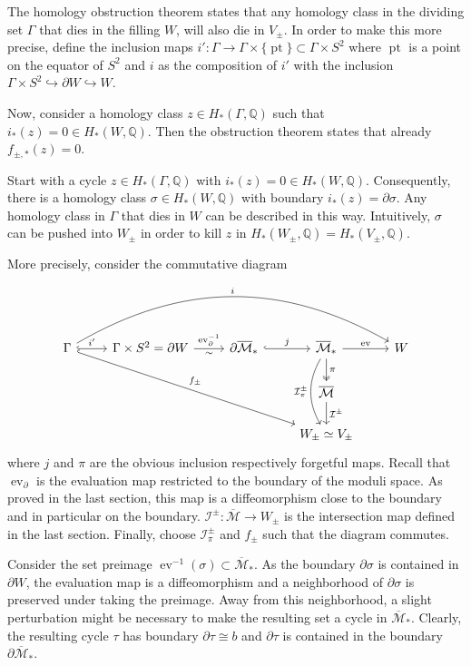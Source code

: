 The homology obstruction theorem states that any homology class in the dividing set $\Gamma$ that dies in the filling $W$,
will also die in $V_\pm$.
In order to make this more precise, define the inclusion maps
$i'\colon \Gamma \to \Gamma \times \{\operatorname{pt}\} \subset \Gamma \times S^2$ where $\operatorname{pt}$ is a point on the equator of $S^2$
and $i$ as the composition of $i'$ with the inclusion $\Gamma \times S^2 \hookrightarrow \partial W \hookrightarrow W$. 

Now, consider a homology class $z \in H_*(\Gamma, \mathbb{Q})$ such that $i_*(z) = 0 \in H_*(W, \mathbb{Q})$.
Then the obstruction theorem states that already $f_{\pm,*}(z) = 0$.


Start with a cycle $z \in H_*(\Gamma, \mathbb Q)$ with $i_*(z) = 0 \in H_*(W, \mathbb{Q})$.
Consequently, there is a homology class $\sigma \in H_*(W, \mathbb Q)$ with boundary $i_*(z) = \partial \sigma$.
Any homology class in $\Gamma$ that dies in $W$ can be described in this way.
Intuitively, $\sigma$ can be pushed into $W_\pm$ in order to kill $z$ in $H_*(W_\pm, \mathbb{Q}) = H_*(V_\pm, \mathbb{Q})$.

More precisely, consider the commutative diagram
\[
\begin{tikzcd}
    \Gamma \arrow[r, hook, "i'"] \arrow[rrrr, bend left, "i"] \arrow[rrrdd, hook, "f_\pm"]
        & \Gamma \times S^2  = \partial W  \arrow[r, "\operatorname{ev}_\partial^{-1}", "\sim" below]
        & \partial \overline{\mathcal M}_* \arrow[r, hook, "j"]
        & \overline{\mathcal M}_*          \arrow[r, "\operatorname{ev}"] \arrow[d, twoheadrightarrow, "\pi"] \arrow[dd, bend right, "\mathcal I_\pi^\pm" left]
        & W \\
    &&& \overline{\mathcal M} \arrow[d, "\mathcal{I}^\pm"]  &   \\
    &&& W_\pm \simeq V_\pm                                  &   
\end{tikzcd}
\]
where $j$ and $\pi$ are the obvious inclusion respectively forgetful maps.
Recall that $\operatorname{ev}_\partial$ is the evaluation map restricted to the boundary of the moduli space. 
As proved in the last section, this map is a diffeomorphism close to the boundary and in particular on the boundary.
$\mathcal{I}^\pm\colon \overline{\mathcal{M}} \to W_\pm$ is the intersection map defined in the last section.
Finally, choose $\mathcal I_\pi^\pm$ and $f_\pm$ such that the diagram commutes.

Consider the set preimage $\operatorname{ev}^{-1}(\sigma) \subset \overline{\mathcal M}_*$.
As the boundary $\partial \sigma$ is contained in $\partial W$, the evaluation map is a diffeomorphism
and a neighborhood of $\partial \sigma$ is preserved under taking the preimage.
Away from this neighborhood, a slight perturbation might be necessary to make the resulting set a cycle in $\overline{\mathcal M}_*$.
Clearly, the resulting cycle $\tau$ has boundary $\partial \tau \cong b$ and $\partial \tau$ is contained in the boundary $\partial \overline{\mathcal M}_*$.

